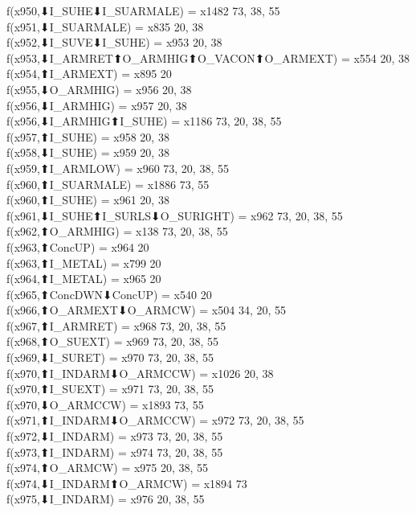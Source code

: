 f(x950,⬇I_SUHE⬇I_SUARMALE) = x1482 {73, 38, 55} \\
f(x951,⬇I_SUARMALE) = x835 {20, 38} \\
f(x952,⬇I_SUVE⬇I_SUHE) = x953 {20, 38} \\
f(x953,⬇I_ARMRET⬆O_ARMHIG⬆O_VACON⬆O_ARMEXT) = x554 {20, 38} \\
f(x954,⬆I_ARMEXT) = x895 {20} \\
f(x955,⬇O_ARMHIG) = x956 {20, 38} \\
f(x956,⬇I_ARMHIG) = x957 {20, 38} \\
f(x956,⬇I_ARMHIG⬆I_SUHE) = x1186 {73, 20, 38, 55} \\
f(x957,⬆I_SUHE) = x958 {20, 38} \\
f(x958,⬇I_SUHE) = x959 {20, 38} \\
f(x959,⬆I_ARMLOW) = x960 {73, 20, 38, 55} \\
f(x960,⬆I_SUARMALE) = x1886 {73, 55} \\
f(x960,⬆I_SUHE) = x961 {20, 38} \\
f(x961,⬇I_SUHE⬆I_SURLS⬇O_SURIGHT) = x962 {73, 20, 38, 55} \\
f(x962,⬆O_ARMHIG) = x138 {73, 20, 38, 55} \\
f(x963,⬆ConcUP) = x964 {20} \\
f(x963,⬆I_METAL) = x799 {20} \\
f(x964,⬆I_METAL) = x965 {20} \\
f(x965,⬆ConcDWN⬇ConcUP) = x540 {20} \\
f(x966,⬆O_ARMEXT⬇O_ARMCW) = x504 {34, 20, 55} \\
f(x967,⬆I_ARMRET) = x968 {73, 20, 38, 55} \\
f(x968,⬆O_SUEXT) = x969 {73, 20, 38, 55} \\
f(x969,⬇I_SURET) = x970 {73, 20, 38, 55} \\
f(x970,⬆I_INDARM⬇O_ARMCCW) = x1026 {20, 38} \\
f(x970,⬆I_SUEXT) = x971 {73, 20, 38, 55} \\
f(x970,⬇O_ARMCCW) = x1893 {73, 55} \\
f(x971,⬆I_INDARM⬇O_ARMCCW) = x972 {73, 20, 38, 55} \\
f(x972,⬇I_INDARM) = x973 {73, 20, 38, 55} \\
f(x973,⬆I_INDARM) = x974 {73, 20, 38, 55} \\
f(x974,⬆O_ARMCW) = x975 {20, 38, 55} \\
f(x974,⬇I_INDARM⬆O_ARMCW) = x1894 {73} \\
f(x975,⬇I_INDARM) = x976 {20, 38, 55} \\
